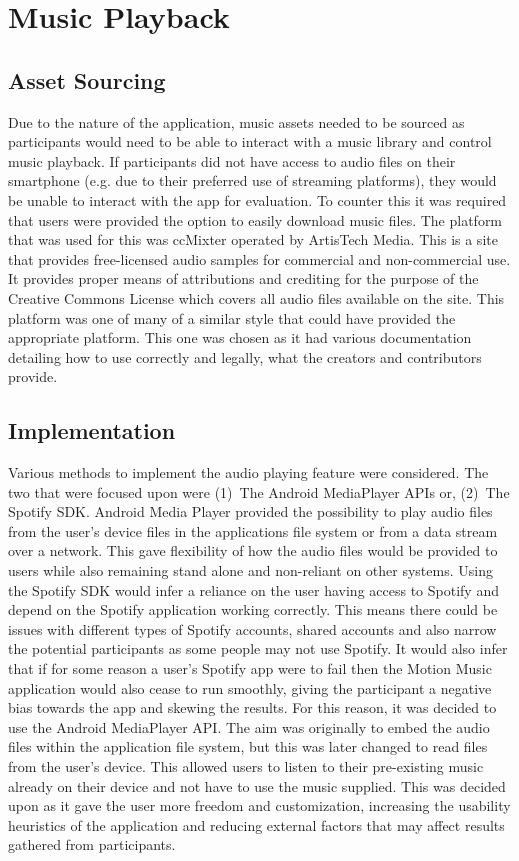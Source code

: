 \documentclass{l4proj}
\begin{document}
\section{Music Playback}

\subsection{Asset Sourcing}
Due to the nature of the application, music assets needed to be sourced as participants would need to be able to interact with a music library and control music playback. If participants did not have access to audio files on their smartphone (e.g. due to their preferred use of streaming platforms), they would be unable to interact with the app for evaluation. To counter this it was required that users were provided the option to easily download music files. The platform that was used for this was ccMixter operated by ArtisTech Media. This is a site that provides free-licensed audio samples for commercial and non-commercial use. It provides proper means of attributions and crediting for the purpose of the Creative Commons License which covers all audio files available on the site. This platform was one of many of a similar style that could have provided the appropriate platform. This one was chosen as it had various documentation detailing how to use correctly and legally, what the creators and contributors provide.

\subsection{Implementation}
Various methods to implement the audio playing feature were considered. The two that were focused upon were (1)~The Android MediaPlayer APIs or, (2)~The Spotify SDK. Android Media Player provided the possibility to play audio files from the user’s device files in the applications file system or from a data stream over a network. This gave flexibility of how the audio files would be provided to users while also remaining stand alone and non-reliant on other systems. Using the Spotify SDK would infer a reliance on the user having access to Spotify and depend on the Spotify application working correctly. This means there could be issues with different types of Spotify accounts, shared accounts and also narrow the potential participants as some people may not use Spotify. It would also infer that if for some reason a user's Spotify app were to fail then the Motion Music application would also cease to run smoothly, giving the participant a negative bias towards the app and skewing the results. For this reason, it was decided to use the Android MediaPlayer API. The aim was originally to embed the audio files within the application file system, but this was later changed to read files from the user’s device. This allowed users to listen to their pre-existing music already on their device and not have to use the music supplied. This was decided upon as it gave the user more freedom and customization, increasing the usability heuristics of the application and reducing external factors that may affect results gathered from participants.
\end{document}
